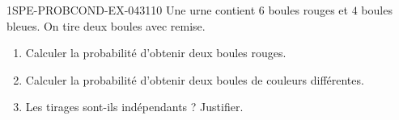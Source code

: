 \begin{exercice}{1SPE-PROBCOND-EX-043}{1}{10}
Une urne contient $6$ boules rouges et $4$ boules bleues. On tire deux boules avec remise.

\begin{enumerate}
  \item Calculer la probabilité d'obtenir deux boules rouges.
  \item Calculer la probabilité d'obtenir deux boules de couleurs différentes.
  \item Les tirages sont-ils indépendants ? Justifier.
\end{enumerate}
\end{exercice}

